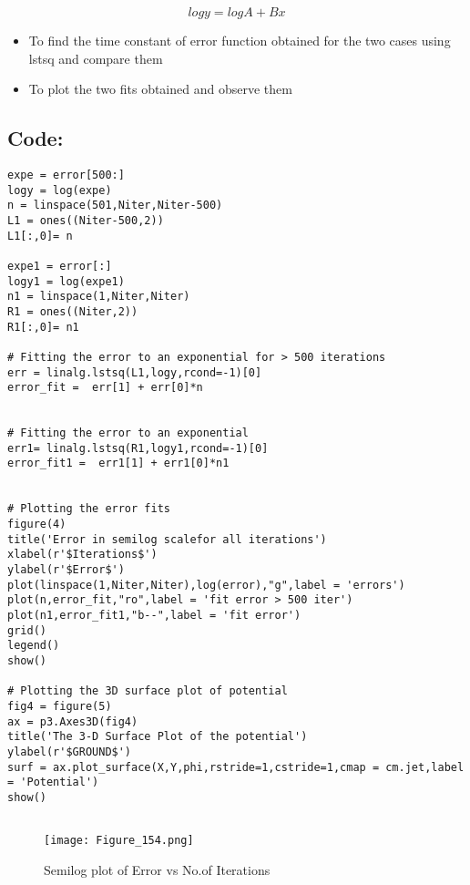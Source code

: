 \documentclass[11pt, a4paper, twoside]{article}
\begin{document}
\begin{equation}
    logy = logA + Bx
\end{equation}

\begin{itemize}
\item
  To find the time constant of error function obtained for the two cases
  using lstsq and compare them
\item
  To plot the two fits obtained and observe them
\end{itemize}

\subsection*{Code:}

\begin{verbatim}
expe = error[500:]
logy = log(expe)
n = linspace(501,Niter,Niter-500)
L1 = ones((Niter-500,2))
L1[:,0]= n

expe1 = error[:]
logy1 = log(expe1)
n1 = linspace(1,Niter,Niter)
R1 = ones((Niter,2))
R1[:,0]= n1

# Fitting the error to an exponential for > 500 iterations
err = linalg.lstsq(L1,logy,rcond=-1)[0] 
error_fit =  err[1] + err[0]*n


# Fitting the error to an exponential
err1= linalg.lstsq(R1,logy1,rcond=-1)[0] 
error_fit1 =  err1[1] + err1[0]*n1


# Plotting the error fits
figure(4)
title('Error in semilog scalefor all iterations')
xlabel(r'$Iterations$')
ylabel(r'$Error$')
plot(linspace(1,Niter,Niter),log(error),"g",label = 'errors')
plot(n,error_fit,"ro",label = 'fit error > 500 iter')
plot(n1,error_fit1,"b--",label = 'fit error')
grid()
legend()
show()

# Plotting the 3D surface plot of potential
fig4 = figure(5) 
ax = p3.Axes3D(fig4)
title('The 3-D Surface Plot of the potential')
ylabel(r'$GROUND$')
surf = ax.plot_surface(X,Y,phi,rstride=1,cstride=1,cmap = cm.jet,label = 'Potential')
show()


\end{verbatim}



\begin{figure}[!tbh]
 \centering
 \texttt{[image: Figure\_154.png]}  
 \caption{Semilog plot of Error vs No.of Iterations}
\end{figure}


\newpage
\end{document}
